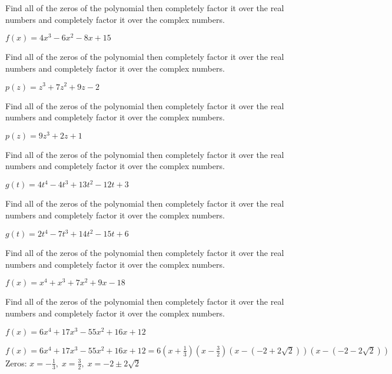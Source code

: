 \documentclass{ximera}
\begin{document}
\begin{problem}
Find all of the zeros of the polynomial then completely factor it over the real numbers and completely factor it over the complex numbers.

$f(x) = 4x^3-6x^2-8x+15$
\end{problem}

\begin{problem}
Find all of the zeros of the polynomial then completely factor it over the real numbers and completely factor it over the complex numbers.

$p(z) = z^3 + 7z^2+9z-2$
\end{problem}

\begin{problem}
Find all of the zeros of the polynomial then completely factor it over the real numbers and completely factor it over the complex numbers.

$p(z) = 9z^3+2z+1$
\end{problem}

\begin{problem}
Find all of the zeros of the polynomial then completely factor it over the real numbers and completely factor it over the complex numbers.

$g(t) = 4t^{4} - 4t^{3} + 13t^{2} - 12t + 3$
\end{problem}

\begin{problem}
Find all of the zeros of the polynomial then completely factor it over the real numbers and completely factor it over the complex numbers.

$g(t) = 2t^4-7t^3+14t^2-15t+6$
\end{problem}

\begin{problem}
Find all of the zeros of the polynomial then completely factor it over the real numbers and completely factor it over the complex numbers.

$f(x) = x^4+x^3+7x^2+9x-18$
\end{problem}

\begin{problem}
Find all of the zeros of the polynomial then completely factor it over the real numbers and completely factor it over the complex numbers.

$f(x) = 6x^4+17x^3-55x^2+16x+12$

\begin{solution}
$f(x) = 6x^4+17x^3-55x^2+16x+12 = 6 \left(x + \frac{1}{3} \right) \left(x - \frac{3}{2} \right) \left(x - \left( -2 + 2 \sqrt{2}\right)\right) \left(x - \left( -2 - 2 \sqrt{2}\right)\right)$ \\
Zeros:  $x = -\frac{1}{3}, \; x = \frac{3}{2}, \; x = -2 \pm 2 \sqrt{2}$
\end{solution}
\end{problem}
\end{document}
